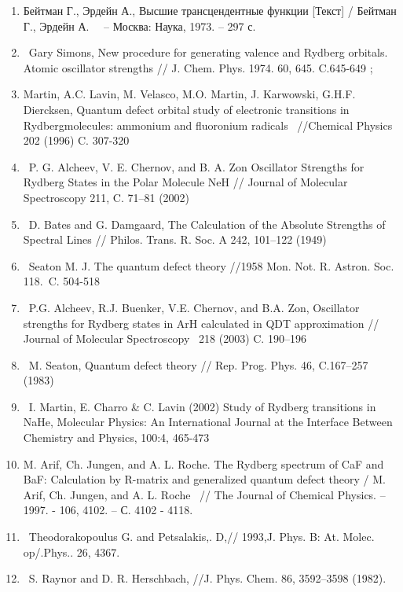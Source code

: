 \documentclass[a4paper]{article}
\newcounter{saveenum}
\newcommand\liststyleWWNumi{%
\renewcommand\theenumi{\arabic{enumi}}
\renewcommand\theenumii{\Roman{enumii}}
\renewcommand\theenumiii{\roman{enumiii}}
\renewcommand\theenumiv{\arabic{enumiv}}
\renewcommand\labelenumi{\theenumi.}
\renewcommand\labelenumii{\theenumii.}
\renewcommand\labelenumiii{\theenumiii.}
\renewcommand\labelenumiv{\theenumiv.}
}
\begin{document}
\liststyleWWNumi
\setcounter{saveenum}{\value{enumi}}
\begin{enumerate}
\setcounter{enumi}{\value{saveenum}}
\item Бейтман Г., Эрдейн
А., Высшие трансцендентные
функции [Текст] /
Бейтман Г., Эрдейн
А. \ \ {}-- Москва: Наука, 1973. -- 297
с.
\item \foreignlanguage{english}{\ Gary Simons, New procedure for generating valence and Rydberg orbitals. Atomic
oscillator strengths // J. Chem. Phys. 1974. 60, 645. C.645-649 ;}
\item \foreignlanguage{english}{Martin, A.C. Lavin, M. Velasco, M.O. Martin, J. Karwowski, G.H.F. Diercksen, Quantum
defect orbital study of electronic transitions in Rydbergmolecules: ammonium and fluoronium radicals \ //Chemical
Physics 202 (1996) C. 307-320}
\item \foreignlanguage{english}{\ P. G. Alcheev, V. E. Chernov, and B. A. Zon Oscillator Strengths for Rydberg States in
the Polar Molecule NeH // Journal of Molecular Spectroscopy 211, C. 71--81 (2002)}
\item \foreignlanguage{english}{\ D. Bates and G. Damgaard, The Calculation of the Absolute Strengths of Spectral Lines
// Philos. Trans. R. Soc. A 242, 101--122 (1949)}
\item \foreignlanguage{english}{\ Seaton M. J. The quantum defect theory //1958 Mon. Not. R. Astron. Soc. 118.~C.
504-518}
\item \foreignlanguage{english}{\ P.G. Alcheev, R.J. Buenker, V.E. Chernov, and B.A. Zon, Oscillator strengths for
Rydberg states in ArH calculated in QDT approximation // Journal of Molecular Spectroscopy \ 218 (2003) C. 190--196}
\item \foreignlanguage{english}{\ M. Seaton, Quantum defect theory // Rep. Prog. Phys. 46, C.167--257 (1983)}
\item \foreignlanguage{english}{\ I. Martin, E. Charro \& C. Lavin (2002) Study of Rydberg transitions in NaHe,
Molecular Physics: An International Journal at the Interface Between Chemistry and Physics, 100:4, 465-473}
\item \foreignlanguage{english}{M. Arif, Ch. Jungen, and A. L. Roche. The Rydberg spectrum of CaF and BaF: Calculation
by R-matrix and generalized quantum defect theory / M. Arif, Ch. Jungen, and A. L. Roche \ // The Journal of Chemical
Physics. -- 1997. - 106, 4102. -- }С\foreignlanguage{english}{. 4102 - 4118.}
\item \foreignlanguage{english}{\ Theodorakopoulus G. and Petsalakis,. D,// 1993,J. Phys. B: At. Molec. op/.Phys.. 26,
4367.}
\item \foreignlanguage{english}{\ S. Raynor and D. R. Herschbach, //J. Phys. Chem. 86, 3592--3598 (1982).}
\end{enumerate}

\bigskip
\end{document}
